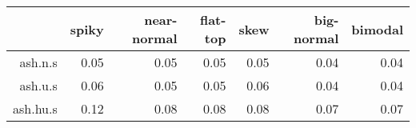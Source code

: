 \begin{tabular}{rrrrrrr}
  \toprule  & spiky & near-normal & flat-top & skew & big-normal & bimodal \\ 
  \midrule ash.n.s & 0.05 & 0.05 & 0.05 & 0.05 & 0.04 & 0.04 \\ 
  ash.u.s & 0.06 & 0.05 & 0.05 & 0.06 & 0.04 & 0.04 \\ 
  ash.hu.s & 0.12 & 0.08 & 0.08 & 0.08 & 0.07 & 0.07 \\ 
   \bottomrule \end{tabular}

